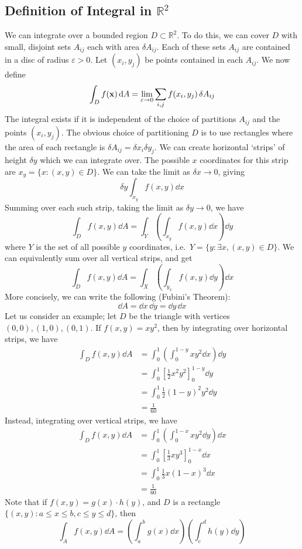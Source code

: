 \subsection{Definition of Integral in \(\mathbb R^2\)}
We can integrate over a bounded region \(D \subset \mathbb R^2\).
To do this, we can cover \(D\) with small, disjoint sets \(A_{ij}\) each with area \(\delta A_{ij}\).
Each of these sets \(A_{ij}\) are contained in a disc of radius \(\varepsilon > 0\).
Let \((x_i, y_j)\) be points contained in each \(A_{ij}\).
We now define
\[
	\int_D f(\vb x) \dd{A} = \lim_{\varepsilon \to 0} \sum_{i, j} f(x_i, y_j) \,\delta A_{ij}
\]
The integral exists if it is independent of the choice of partitions \(A_{ij}\) and the points \((x_i, y_j)\).
The obvious choice of partitioning \(D\) is to use rectangles where the area of each rectangle is \(\delta A_{ij} = \delta x_i \delta y_j\).
We can create horizontal `strips' of height \(\delta y\) which we can integrate over.
The possible \(x\) coordinates for this strip are \(x_y = \{ x \colon (x, y) \in D \}\).
We can take the limit as \(\delta x \to 0\), giving
\[
	\delta y \int_{x_y} f(x, y) \dd{x}
\]
Summing over each such strip, taking the limit as \(\delta y \to 0\), we have
\[
	\int_D f(x, y) \dd{A} = \int_Y \left( \int_{x_y} f(x, y) \dd{x} \right) \dd{y}
\]
where \(Y\) is the set of all possible \(y\) coordinates, i.e.\ \(Y = \{ y \colon \exists x, (x, y) \in D \}\).
We can equivalently sum over all vertical strips, and get
\[
	\int_D f(x, y) \dd{A} = \int_X \left( \int_{y_x} f(x, y) \dd{y} \right) \dd{x}
\]
More concisely, we can write the following (Fubini's Theorem):
\[
	\dd{A} = \dd{x} \, \dd{y} = \dd{y} \, \dd{x}
\]
Let us consider an example; let \(D\) be the triangle with vertices \((0, 0), (1, 0), (0, 1)\).
If \(f(x, y) = xy^2\), then by integrating over horizontal strips, we have
\begin{align*}
	\int_D f(x, y) \dd{A} & = \int_0^1 \left( \int_0^{1-y} xy^2 \dd{x} \right) \dd{y}  \\
	                      & = \int_0^1 \left[ \frac{1}{2}x^2y^2 \right]_0^{1-y} \dd{y} \\
	                      & = \int_0^1 \frac{1}{2}(1-y)^2y^2 \dd{y}                    \\
	                      & = \frac{1}{60}
\end{align*}
Instead, integrating over vertical strips, we have
\begin{align*}
	\int_D f(x, y) \dd{A} & = \int_0^1 \left( \int_0^{1-x} xy^2 \dd{y} \right) \dd{x} \\
	                      & = \int_0^1 \left[ \frac{1}{3} xy^3 \right]_0^{1-x} \dd{x} \\
	                      & = \int_0^1 \frac{1}{3} x(1-x)^3 \dd{x}                    \\
	                      & = \frac{1}{60}
\end{align*}
Note that if \(f(x, y) = g(x) \cdot h(y)\), and \(D\) is a rectangle \(\{ (x, y) \colon a \leq x \leq b, c \leq y \leq d \}\), then
\[
	\int_A f(x, y) \dd{A} = \left( \int_a^b g(x) \dd{x} \right)\left( \int_c^d h(y) \dd{y} \right)
\]

